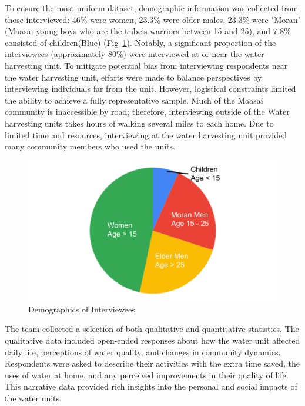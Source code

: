 \documentclass[10pt, twocolumn]{article}
\begin{document}
To ensure the most uniform dataset, demographic information was collected from those interviewed: 46\% were women, 23.3\% were older males, 23.3\% were "Moran" (Maasai young boys who are the tribe’s warriors between 15 and 25), and 7-8\% consisted of children(Blue) (Fig~\ref{fig:demographics}). Notably, a significant proportion of the interviewees (approximately 80\%) were interviewed at or near the water harvesting unit. To mitigate potential bias from interviewing respondents near the water harvesting unit, efforts were made to balance perspectives by interviewing individuals far from the unit. However, logistical constraints limited the ability to achieve a fully representative sample. Much of the Maasai community is inaccessible by road; therefore, interviewing outside of the Water harvesting units takes hours of walking several miles to each home. Due to limited time and resources, interviewing at the water harvesting unit provided many community members who used the units.

\begin{figure} [H]
    \centering
    \includegraphics[width=1\linewidth]{photos/demographic_split.png}
    \caption{Demographics of Interviewees}
    \label{fig:demographics}
\end{figure}

The team collected a selection of both qualitative and quantitative statistics. The qualitative data included open-ended responses about how the water unit affected daily life, perceptions of water quality, and changes in community dynamics. Respondents were asked to describe their activities with the extra time saved, the uses of water at home, and any perceived improvements in their quality of life. This narrative data provided rich insights into the personal and social impacts of the water units.
\end{document}
